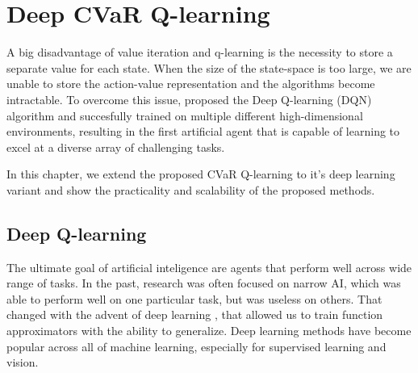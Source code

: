 \chapter{Deep CVaR Q-learning}\label{ch:dqn}

A big disadvantage of value iteration and q-learning is the necessity to store a separate value for each state. When the size of the state-space is too large, we are unable to store the action-value representation and the algorithms become intractable. To overcome this issue, \citet{mnih2015human} proposed the Deep Q-learning (DQN) algorithm and succesfully trained on multiple different high-dimensional environments, resulting in the first artificial agent that is capable of learning to excel at a diverse array of challenging tasks.

In this chapter, we extend the proposed CVaR Q-learning to it's deep learning variant and show the practicality and scalability of the proposed methods.

\section{Deep Q-learning}
The ultimate goal of artificial inteligence are agents that perform well across wide range of tasks. In the past, research was often focused on narrow AI, which was able to perform well on one particular task, but was useless on others. That changed with the advent of deep learning \cite{neco}, that allowed us to train function approximators with the ability to generalize. Deep learning methods have become popular across all of machine learning, especially for supervised learning and vision.



